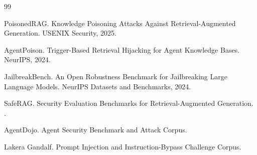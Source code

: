 \documentclass[11pt,a4paper]{ctexart}
\begin{document}
\begin{thebibliography}{99}

PoisonedRAG.
\newblock Knowledge Poisoning Attacks Against Retrieval-Augmented Generation.
\newblock USENIX Security, 2025.

AgentPoison.
\newblock Trigger-Based Retrieval Hijacking for Agent Knowledge Bases.
\newblock NeurIPS, 2024.

JailbreakBench.
\newblock An Open Robustness Benchmark for Jailbreaking Large Language Models.
\newblock NeurIPS Datasets and Benchmarks, 2024.

SafeRAG.
\newblock Security Evaluation Benchmarks for Retrieval-Augmented Generation.
.

AgentDojo.
\newblock Agent Security Benchmark and Attack Corpus.

Lakera Gandalf.
\newblock Prompt Injection and Instruction-Bypass Challenge Corpus.

\end{thebibliography}
\end{document}
